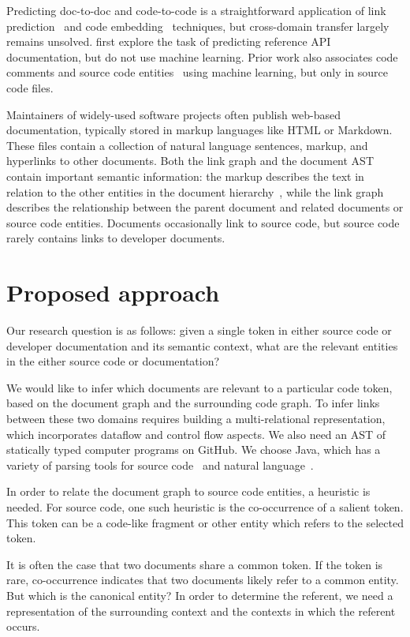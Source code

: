 \documentclass{article}
\begin{document}
Predicting doc-to-doc and code-to-code is a straightforward application of link prediction~\citep{zhang2018link} and code embedding~\citep{gu2018deep} techniques, but cross-domain transfer largely remains unsolved. \citet{robillard2015recommending} first explore the task of predicting reference API documentation, but do not use machine learning. Prior work also associates code comments and source code entities~\citep{panthaplackel2020associating} using machine learning, but only in source code files.

Maintainers of widely-used software projects often publish web-based documentation, typically stored in markup languages like HTML or Markdown. These files contain a collection of natural language sentences, markup, and hyperlinks to other documents. Both the link graph and the document AST contain important semantic information: the markup describes the text in relation to the other entities in the document hierarchy~\citep{yang2016hierarchical}, while the link graph describes the relationship between the parent document and related documents or source code entities. Documents occasionally link to source code, but source code rarely contains links to developer documents.

\section{Proposed approach}

Our research question is as follows: given a single token in either source code or developer documentation and its semantic context, what are the relevant entities in the either source code or documentation?

We would like to infer which documents are relevant to a particular code token, based on the document graph and the surrounding code graph. To infer links between these two domains requires building a multi-relational representation, which incorporates dataflow and control flow aspects. We also need an AST of statically typed computer programs on GitHub. We choose Java, which has a variety of parsing tools for source code~\citep{kovalenko2019pathminer} and natural language~\citep{grella2018non}.

In order to relate the document graph to source code entities, a heuristic is needed. For source code, one such heuristic is the co-occurrence of a salient token. This token can be a code-like fragment or other entity which refers to the selected token.

It is often the case that two documents share a common token. If the token is rare, co-occurrence indicates that two documents likely refer to a common entity. But which is the canonical entity? In order to determine the referent, we need a representation of the surrounding context and the contexts in which the referent occurs.
\end{document}
